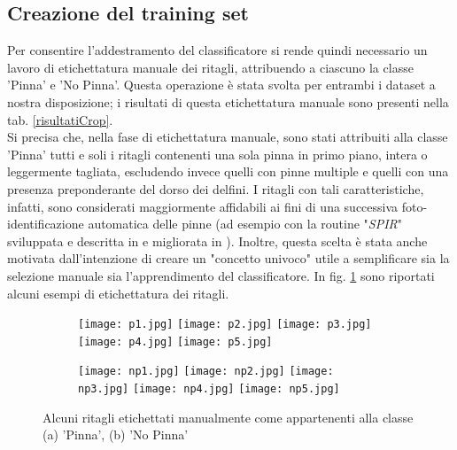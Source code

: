 \subsection*{Creazione del training set}

Per consentire l'addestramento del classificatore si rende quindi necessario un lavoro di etichettatura manuale dei ritagli, attribuendo a ciascuno la classe 'Pinna' e 'No Pinna'. Questa operazione è stata svolta per entrambi i dataset a nostra disposizione; i risultati di questa etichettatura manuale sono presenti nella tab. \ref{risultatiCrop}.\\

Si precisa che, nella fase di etichettatura manuale, sono stati attribuiti alla classe 'Pinna' tutti e soli i ritagli contenenti una sola pinna in primo piano, intera o leggermente tagliata, escludendo invece quelli con pinne multiple e quelli con una presenza preponderante del dorso dei delfini. I ritagli con tali caratteristiche, infatti, sono considerati maggiormente affidabili ai fini di una successiva foto-identificazione automatica delle pinne (ad esempio con la routine "\textit{SPIR}" sviluppata e descritta in \cite{maglietta} e migliorata in \cite{emanuele}). Inoltre, questa scelta è stata anche motivata dall’intenzione di creare un "concetto univoco" utile a semplificare sia la selezione manuale sia l’apprendimento del classificatore.
In fig. \ref{fig:esempiPinnaNoPinna} sono riportati alcuni esempi di etichettatura dei ritagli.

\begin{figure}[h!]

  \centering
  
  \begin{subfigure}[b]{0.7\textwidth}
    \texttt{[image: p1.jpg]}
    \hfill
    \texttt{[image: p2.jpg]}
    \hfill
    \texttt{[image: p3.jpg]}
    \hfill
    \texttt{[image: p4.jpg]}
    \hfill
    \texttt{[image: p5.jpg]}
    \caption{}
  \end{subfigure}
  
  \vspace{5mm}
  
  \begin{subfigure}[b]{0.7\textwidth}
    \texttt{[image: np1.jpg]}
    \hfill
    \texttt{[image: np2.jpg]}
    \hfill
    \texttt{[image: np3.jpg]}
    \hfill
    \texttt{[image: np4.jpg]}
    \hfill
    \texttt{[image: np5.jpg]}
    \caption{}
  \end{subfigure}
  
  \caption{Alcuni ritagli etichettati manualmente come appartenenti alla classe (a) 'Pinna', (b) 'No Pinna'}
  \label{fig:esempiPinnaNoPinna}
\end{figure}

